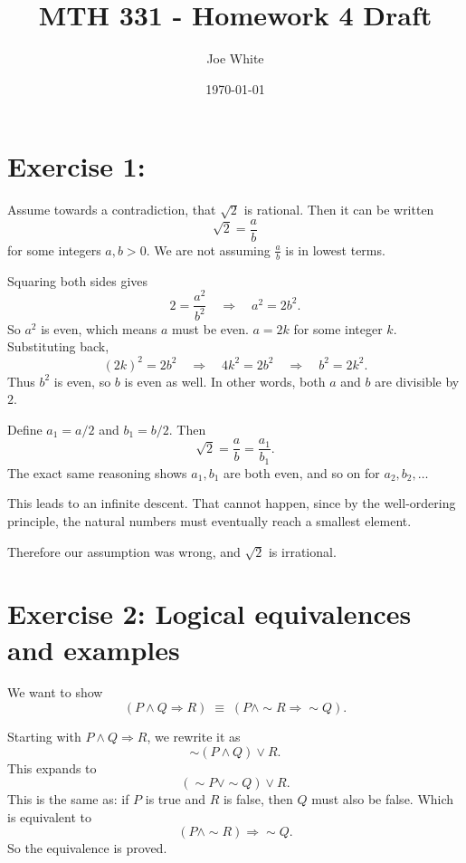 \documentclass[11pt]{article}
\title{MTH 331 - Homework 4 Draft}
\author{Joe White}
\date{\today}
\begin{document}
\maketitle

\section*{Exercise 1:}

Assume towards a contradiction, that $\sqrt{2}$ is rational. Then it can be written
\[
\sqrt{2} = \frac{a}{b}
\]
for some integers $a, b > 0$. We are not assuming $\tfrac{a}{b}$ is in lowest terms.

Squaring both sides gives
\[
2 = \frac{a^2}{b^2} \quad \Rightarrow \quad a^2 = 2b^2.
\]
So $a^2$ is even, which means $a$ must be even. $a = 2k$ for some integer $k$. Substituting back,
\[
(2k)^2 = 2b^2 \quad \Rightarrow \quad 4k^2 = 2b^2 \quad \Rightarrow \quad b^2 = 2k^2.
\]
Thus $b^2$ is even, so $b$ is even as well. In other words, both $a$ and $b$ are divisible by $2$.  

Define $a_1 = a/2$ and $b_1 = b/2$. Then
\[
\sqrt{2} = \frac{a}{b} = \frac{a_1}{b_1}.
\]
The exact same reasoning shows $a_1, b_1$ are both even, and so on for $a_2, b_2, \dots$  

This leads to an infinite descent. That cannot happen, since by the well-ordering principle, the natural numbers must eventually reach a smallest element.  

Therefore our assumption was wrong, and $\sqrt{2}$ is irrational.

\bigskip

\section*{Exercise 2: Logical equivalences and examples}

We want to show
\[
(P \wedge Q \Rightarrow R) \;\equiv\; (P \wedge \sim R \Rightarrow \sim Q).
\]

Starting with $P \wedge Q \Rightarrow R$, we rewrite it as
\[
\sim (P \wedge Q) \vee R.
\]
This expands to
\[
(\sim P \vee \sim Q) \vee R.
\]
This is the same as: if $P$ is true and $R$ is false, then $Q$ must also be false. Which is equivalent to
\[
(P \wedge \sim R) \Rightarrow \sim Q.
\]
So the equivalence is proved.

\bigskip
\end{document}
